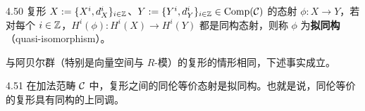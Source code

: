 \begin{definition}{4.50}
复形 $X:=\{X^i,d_X^i\}_{i\in\mathbb{Z}}$、$Y:=\{Y^i,d_Y^i\}_{i\in\mathbb{Z}}\in\operatorname{Comp}(\mathcal{C})$ 的态射 $\phi\colon X\to Y$，若对每个 $i\in\mathbb{Z}$，$H^i(\phi)\colon H^i(X)\to H^i(Y)$ 都是同构态射，则称 $\phi$ 为\textbf{拟同构}（quasi-isomorphism）。
\end{definition}

与阿贝尔群（特别是向量空间与 $R$-模）的复形的情形相同，下述事实成立。

\begin{proposition}{4.51}
在加法范畴 $\mathcal{C}$ 中，复形之间的同伦等价态射是拟同构。也就是说，同伦等价的复形具有同构的上同调。
\end{proposition}
